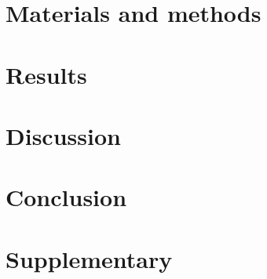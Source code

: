 \documentclass[10pt]{article}
\begin{document}
	\section{Materials and methods}
	
	\label{section:Chap_Material_and_Methods}
	\newpage
	
	\section{Results}
	
	\label{section:Chap_Results}
	\newpage
	
	\section{Discussion}
	
	\label{section:Chap_Discussion}
	\newpage
	
	\section{Conclusion}
	
	\label{section:Chap_Conclusion}
	\newpage
	
%	
	
	\section*{Supplementary}
	
	\label{section:Chap_Supplementary}
	\newpage
	

	
	
\end{document}
